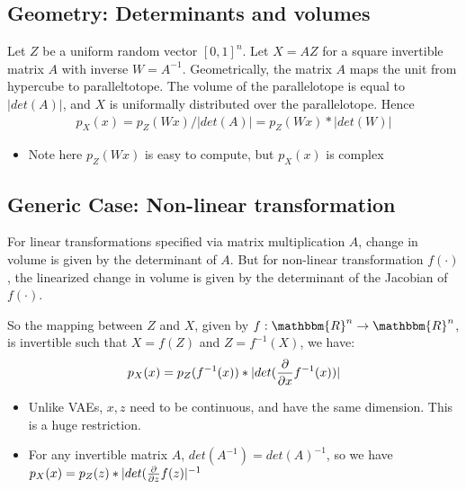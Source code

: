 \subsection{Geometry: Determinants and volumes} 
Let $Z$ be a uniform random vector $[0,1]^n$. Let $X=AZ$ for a square invertible matrix $A$ with inverse $W =A ^{-1}$. Geometrically, the matrix $A$ maps the unit from hypercube to paralleltotope. The volume of the parallelotope is equal to $|det(A)|$, and $X$ is uniformally distributed over the parallelotope. Hence 
    \begin{align*}
        p_X(x) = p_Z(Wx) / |det(A)| = p_Z(Wx) * |det(W)|
    \end{align*}
    \begin{itemize}
        \item Note here $p_Z(Wx)$ is easy to compute, but $p_X(x)$ is complex
    \end{itemize}

\subsection{Generic Case: Non-linear transformation}
For linear transformations specified via matrix multiplication $A$, change in volume is given by the determinant of $A$. But for non-linear transformation $f(\cdot)$, the linearized change in volume is given by the determinant of the Jacobian of $f(\cdot)$. \\ \par

So the mapping between $Z$ and $X$, given by $f: \mathbbm{R}^n \to \mathbbm{R}^n$, is invertible such that $X = f(Z)$ and $Z = f^{-1}(X)$, we have: 
    \begin{align*}
        p_X(x) = p_Z(f^{-1}(x)) * |det(\frac{\partial}{\partial x} f^{-1}(x))|
    \end{align*}

    \begin{itemize}
        \item Unlike VAEs, $x, z$ need to be continuous, and have the same dimension. This is a huge restriction. 
        \item For any invertible matrix $A$, $det(A^{-1}) = det(A)^{-1}$, so we have $p_X(x) = p_Z(z) * |det(\frac{\partial}{\partial z} f(z)|^{-1}$
    \end{itemize}
    
